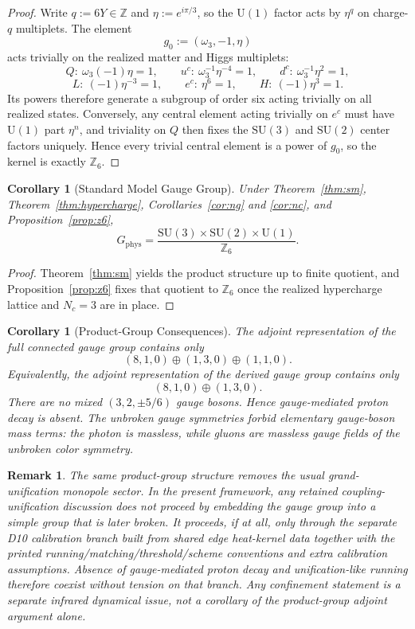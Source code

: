 \documentclass[11pt]{article}
\newtheorem{corollary}[theorem]{Corollary}
\newtheorem{remark}[theorem]{Remark}
\newcommand{\SU}{\mathrm{SU}}
\newcommand{\U}{\mathrm{U}}
\begin{document}
\begin{proof}
Write $q:=6Y\in\mathbb Z$ and $\eta:=e^{i\pi/3}$, so the $\U(1)$ factor acts by $\eta^q$ on charge-$q$ multiplets. The element
\[
g_0:=(\omega_3,-1,\eta)
\]
acts trivially on the realized matter and Higgs multiplets:
\[
Q:\ \omega_3(-1)\eta=1,\qquad
u^c:\ \omega_3^{-1}\eta^{-4}=1,\qquad
d^c:\ \omega_3^{-1}\eta^2=1,
\]
\[
L:\ (-1)\eta^{-3}=1,\qquad
e^c:\ \eta^6=1,\qquad
H:\ (-1)\eta^3=1.
\]
Its powers therefore generate a subgroup of order six acting trivially on all realized states. Conversely, any central element acting trivially on $e^c$ must have $\U(1)$ part $\eta^n$, and triviality on $Q$ then fixes the $\SU(3)$ and $\SU(2)$ center factors uniquely. Hence every trivial central element is a power of $g_0$, so the kernel is exactly $\mathbb Z_6$.
\end{proof}

\begin{corollary}[Standard Model Gauge Group]
Under Theorem~\ref{thm:sm}, Theorem~\ref{thm:hypercharge}, Corollaries~\ref{cor:ng} and \ref{cor:nc}, and Proposition~\ref{prop:z6},
\[
G_{\mathrm{phys}}=
\frac{\SU(3)\times\SU(2)\times\U(1)}{\mathbb Z_6}.
\]
\end{corollary}

\begin{proof}
Theorem~\ref{thm:sm} yields the product structure up to finite quotient, and Proposition~\ref{prop:z6} fixes that quotient to $\mathbb Z_6$ once the realized hypercharge lattice and $N_c=3$ are in place.
\end{proof}

\begin{corollary}[Product-Group Consequences]
The adjoint representation of the full connected gauge group contains only
\[
(8,1,0)\oplus(1,3,0)\oplus(1,1,0).
\]
Equivalently, the adjoint representation of the derived gauge group contains only
\[
(8,1,0)\oplus(1,3,0).
\]
There are no mixed $(3,2,\pm 5/6)$ gauge bosons. Hence gauge-mediated proton decay is absent. The unbroken gauge symmetries forbid elementary gauge-boson mass terms: the photon is massless, while gluons are massless gauge fields of the unbroken color symmetry.
\end{corollary}

\begin{remark}
The same product-group structure removes the usual grand-unification monopole sector. In the present framework, any retained coupling-unification discussion does not proceed by embedding the gauge group into a simple group that is later broken. It proceeds, if at all, only through the separate D10 calibration branch built from shared edge heat-kernel data together with the printed running/matching/threshold/scheme conventions and extra calibration assumptions. Absence of gauge-mediated proton decay and unification-like running therefore coexist without tension on that branch. Any confinement statement is a separate infrared dynamical issue, not a corollary of the product-group adjoint argument alone.
\end{remark}
\end{document}
